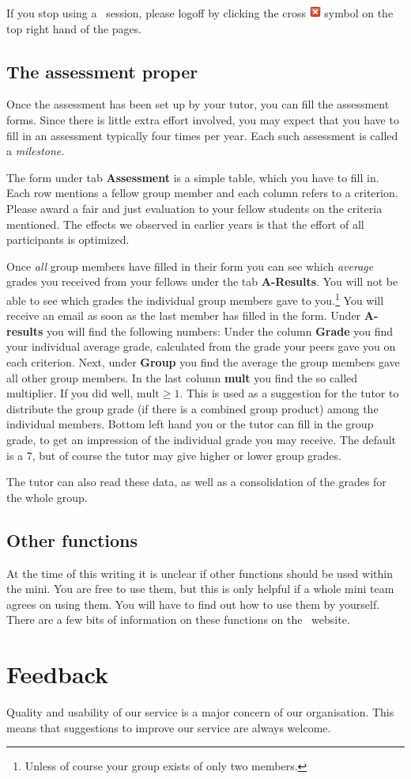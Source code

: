 If you stop using a \peerweb\  session, please logoff by clicking the
cross \includegraphics[height=1em]{close_1.png} symbol on the top right hand of the pages. 

\subsection{The assessment proper}
Once the assessment has been set up by your tutor, you can fill the
assessment forms. Since there is little extra effort involved, you may
expect that you have to fill in an assessment typically four times per
year. Each such assessment is called a \textit{milestone}.

The form under tab \textbf{Assessment} is a simple table, which you have to fill in. 
Each row mentions a fellow group member and each column refers to a
criterion.
Please award a fair and just evaluation to your fellow students
on the criteria mentioned. The effects we observed in earlier years is
that the effort of all participants is optimized.

Once \textit{all} group members have filled in their form you can see
which \textit{average} grades you received from your fellows under the
tab \textbf{A-Results}. You will
not be able to see which grades the individual group members gave to
you.\footnote{Unless of course your group exists of only two members.}
You will receive an email as soon as the last member has filled in the
form. Under \textbf{A-results} you will find the following numbers: Under the column
\textbf{Grade} you find your individual average grade, calculated from the
grade your peers gave you on each criterion. Next, under \textbf{Group} you find the
average the group members gave all other group members. In the last
column \textbf{mult} you find the so called multiplier. If you did
well, $\text{mult} \geq 1$. This is used
as a suggestion for the tutor to distribute the group grade (if there
is a combined group product) among the individual members. Bottom left
hand you or the tutor can fill in the group grade, to get an 
impression of the individual grade you may receive. The default is a
7, but of course the tutor may give higher or lower group grades.

The tutor can also read these data, as well as a consolidation of the
grades for the whole group.

\subsection{Other functions}
At the time of this writing it is unclear if other functions should be
used within the mini. You are free to use them, but this is only
helpful if a whole mini team agrees on using them. You will have to find out how to use them by
yourself. There are a few bits of information on these functions on the
\peerweb\  website.
\section{Feedback}
Quality and usability of our service is a major concern of our organisation.
This means that suggestions to improve our service are always welcome.

